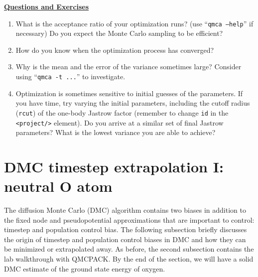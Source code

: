 \vspace{1cm}
\begin{flushleft}
\textbf{\underline{Questions and Exercises}}
\end{flushleft}
\begin{enumerate}
  \item{What is the acceptance ratio of your optimization runs? (use ``\texttt{qmca --help}'' if necessary)  Do you expect the Monte Carlo sampling to be efficient?}
  \item{How do you know when the optimization process has converged?}
  \item{Why is the mean and the error of the variance sometimes large?  Consider using ``\texttt{qmca -t ...}'' to investigate.}
  \item{Optimization is sometimes sensitive to initial guesses of the parameters.  If you have time, try varying the initial parameters, including the cutoff radius (\texttt{rcut}) of the one-body Jastrow factor (remember to change \texttt{id} in the \texttt{<project/>} element).  Do you arrive at a similar set of final Jastrow parameters?  What is the lowest variance you are able to achieve?}
\end{enumerate}



\section{DMC timestep extrapolation I: neutral O atom}
The diffusion Monte Carlo (DMC) algorithm contains two biases in addition to the fixed node and pseudopotential approximations that are important to control: timestep and population control bias.  The following subsection briefly discusses the origin of timestep and population control biases in DMC and how they can be minimized or extrapolated away.  As before, the second subsection contains the lab walkthrough with QMCPACK.  By the end of the section, we will have a solid DMC estimate of the ground state energy of oxygen.

